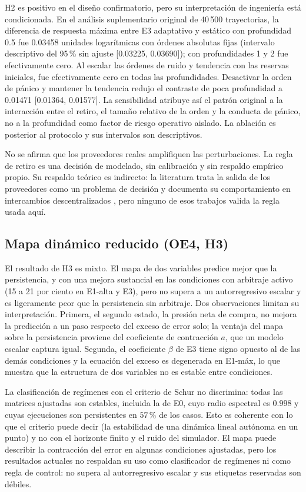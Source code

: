 H2 es positivo en el diseño confirmatorio, pero su interpretación de ingeniería está condicionada. En el análisis suplementario original de 40\,500 trayectorias, la diferencia de respuesta máxima entre E3 adaptativo y estático con profundidad 0.5 fue 0.03458 unidades logarítmicas con órdenes absolutas fijas (intervalo descriptivo del 95\,\% sin ajuste [0.03225, 0.03690]); con profundidades 1 y 2 fue efectivamente cero. Al escalar las órdenes de ruido y tendencia con las reservas iniciales, fue efectivamente cero en todas las profundidades. Desactivar la orden de pánico y mantener la tendencia redujo el contraste de poca profundidad a 0.01471 [0.01364, 0.01577]. La sensibilidad atribuye así el patrón original a la interacción entre el retiro, el tamaño relativo de la orden y la conducta de pánico, no a la profundidad como factor de riesgo operativo aislado. La ablación es posterior al protocolo y sus intervalos son descriptivos.

No se afirma que los proveedores reales amplifiquen las perturbaciones. La regla de retiro es una decisión de modelado, sin calibración y sin respaldo empírico propio. Su respaldo teórico es indirecto: la literatura trata la salida de los proveedores como un problema de decisión \cite{bergault2025exit} y documenta su comportamiento en intercambios descentralizados \cite{lehar2025uniswap}, pero ninguno de esos trabajos valida la regla usada aquí.

\subsection{Mapa dinámico reducido (OE4, H3)}

El resultado de H3 es mixto. El mapa de dos variables predice mejor que la persistencia, y con una mejora sustancial en las condiciones con arbitraje activo (15 a 21 por ciento en E1-alta y E3), pero no supera a un autorregresivo escalar y es ligeramente peor que la persistencia sin arbitraje. Dos observaciones limitan su interpretación. Primera, el segundo estado, la presión neta de compra, no mejora la predicción a un paso respecto del exceso de error solo; la ventaja del mapa sobre la persistencia proviene del coeficiente de contracción $a$, que un modelo escalar captura igual. Segunda, el coeficiente $\beta$ de E3 tiene signo opuesto al de las demás condiciones y la ecuación del exceso es degenerada en E1-máx, lo que muestra que la estructura de dos variables no es estable entre condiciones.

La clasificación de regímenes con el criterio de Schur no discrimina: todas las matrices ajustadas son estables, incluida la de E0, cuyo radio espectral es $0.998$ y cuyas ejecuciones son persistentes en $57\,\%$ de los casos. Esto es coherente con lo que el criterio puede decir (la estabilidad de una dinámica lineal autónoma en un punto) y no con el horizonte finito y el ruido del simulador. El mapa puede describir la contracción del error en algunas condiciones ajustadas, pero los resultados actuales no respaldan su uso como clasificador de regímenes ni como regla de control: no supera al autorregresivo escalar y sus etiquetas reservadas son débiles.

